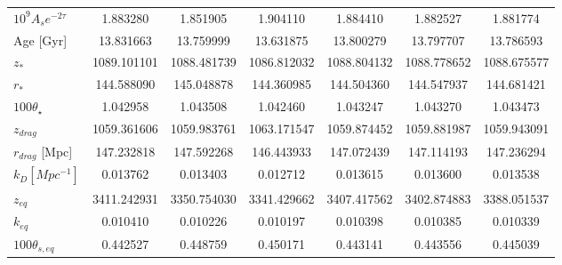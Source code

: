 \documentclass[a4paper,landscape]{article}
\begin{document}
\begin{table}[htbp]
\begin{tabular}{
    l
    S[table-format=1.5(5)] S[table-format=1.5(5)] S[table-format=1.5(5)] 
    S[table-format=1.5(5)] S[table-format=1.5(5)] S[table-format=1.5(5)]
}
$10^9 A_s e^{-2\tau}$ & 1.883280 & 1.851905 & 1.904110 & 1.884410 & 1.882527 & 1.881774 \\
Age [Gyr] & 13.831663 & 13.759999 & 13.631875 & 13.800279 & 13.797707 & 13.786593 \\
$z_{\ast}$ & 1089.101101 & 1088.481739 & 1086.812032 & 1088.804132 & 1088.778652 & 1088.675577 \\
$r_{\ast}$ & 144.588090 & 145.048878 & 144.360985 & 144.504360 & 144.547937 & 144.681421 \\
$100\theta_{\star}$ & 1.042958 & 1.043508 & 1.042460 & 1.043247 & 1.043270 & 1.043473 \\
$z_{drag}$ & 1059.361606 & 1059.983761 & 1063.171547 & 1059.874452 & 1059.881987 & 1059.943091 \\
$r_{drag}$ [Mpc] & 147.232818 & 147.592268 & 146.443933 & 147.072439 & 147.114193 & 147.236294 \\
$k_D [Mpc^{-1}]$ & 0.013762 & 0.013403 & 0.012712 & 0.013615 & 0.013600 & 0.013538 \\
$z_{eq}$ & 3411.242931 & 3350.754030 & 3341.429662 & 3407.417562 & 3402.874883 & 3388.051537 \\
$k_{eq}$ & 0.010410 & 0.010226 & 0.010197 & 0.010398 & 0.010385 & 0.010339 \\
$100\theta_{s,eq}$ & 0.442527 & 0.448759 & 0.450171 & 0.443141 & 0.443556 & 0.445039 \\
\bottomrule
\end{tabular}
\end{table}
\end{document}
